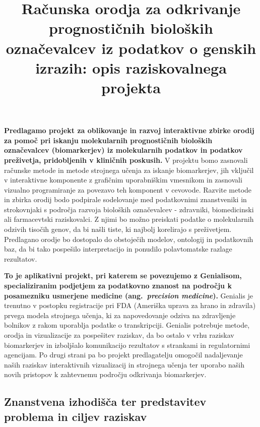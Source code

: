 \documentclass[11pt,a4paper]{article}
\renewcommand{\bold}{\textbf}
\begin{document}
\title{\Large Računska orodja za odkrivanje prognostičnih bioloških označevalcev iz podatkov o genskih izrazih: opis raziskovalnega projekta}
\author{}
\date{}
\maketitle
\vspace*{-1cm}

\bold{Predlagamo projekt za oblikovanje in razvoj interaktivne zbirke orodij za pomoč pri iskanju molekularnih prognostičnih bioloških označevalcev (biomarkerjev) iz molekularnih podatkov in podatkov preživetja, pridobljenih v kliničnih poskusih.} V projektu bomo zasnovali računske metode in metode strojnega učenja za iskanje biomarkerjev, jih vključil v interaktivne komponente z grafičnim uporabniškim vmesnikom in zasnovali vizualno programiranje za povezavo teh komponent v cevovode. Razvite metode in zbirka orodij bodo podpirale sodelovanje med podatkovnimi znanstveniki in strokovnjaki s področja razvoja bioloških označevalcev - zdravniki, biomedicinski ali farmacevtski raziskovalci. Z njimi bo možno preiskati podatke o molekularnih odzivih tisočih genov, da bi našli tiste, ki najbolj korelirajo s preživetjem. Predlagano orodje bo dostopalo do obstoječih modelov, ontologij in podatkovnih baz, da bi tako pospešilo interpretacijo in ponudilo polavtomatske razlage rezultatov.

\bold{To je aplikativni projekt, pri katerem se povezujemo z Genialisom, specializiranim podjetjem za podatkovno znanost na področju k posamezniku usmerjene medicine (ang.~{\em precision medicine}).} Genialis je trenutno v postopku registracije pri FDA (Ameriška uprava za hrano in zdravila) prvega modela strojnega učenja, ki za napovedovanje odziva na zdravljenje bolnikov z rakom uporablja podatke o transkripciji. Genialis potrebuje metode, orodja in vizualizacije za pospešitev raziskav, da bo ostalo v vrhu raziskav biomarkerjev in izboljšalo komunikacijo rezultatov s strankami in regulatornimi agencijam. Po drugi strani pa bo projekt predlagatelju omogočil nadaljevanje naših raziskav interaktivnih vizualizacij in strojnega učenja ter uporabo naših novih pristopov k zahtevnemu področju odkrivanja biomarkerjev.

\subsection{Znanstvena izhodišča ter predstavitev problema in ciljev raziskav}
\end{document}
